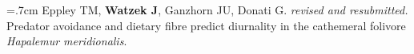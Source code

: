 \documentclass[]{friggeri-cv}
\begin{document}

\hangindent=.7cm Eppley TM, \textbf{Watzek J}, Ganzhorn JU, Donati G. \emph{revised and resubmitted.} Predator avoidance and dietary fibre predict diurnality in the cathemeral folivore \emph{Hapalemur meridionalis}.\\[-.1cm]









\end{document}
